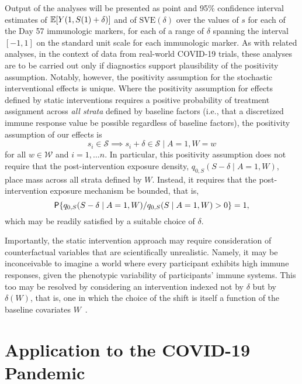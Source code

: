 Output of the analyses will be presented as point and 95\% confidence interval
estimates of $\E[Y(1, S(1) + \delta)]$ and of $\text{SVE}(\delta)$ over the
values of $s$ for each of the Day 57 immunologic markers, for each of a range of
$\delta$ spanning the interval $[-1, 1]$ on the standard unit scale for each
immunologic marker. As with related analyses, in the context of data from
real-world COVID-19 trials, these analyses are to be carried out only if
diagnostics support plausibility of the positivity assumption. Notably, however,
the positivity assumption for the stochastic interventional effects is unique.
Where the positivity assumption for effects defined by static interventions
requires a positive probability of treatment assignment across \textit{all
strata} defined by baseline factors (i.e., that a discretized immune response
value be possible regardless of baseline factors), the positivity assumption of
our effects is
\begin{equation*}
  s_i \in \mathcal{S} \implies s_i + \delta \in \mathcal{S} \mid A = 1, W = w
\end{equation*}
\noindent for all $w \in \mathcal{W}$ and $i = 1, \ldots n$. In particular, this
positivity assumption does not require that the post-intervention exposure
density, $q_{0,S}(S - \delta \mid A = 1, W)$, place mass across all strata
defined by $W$. Instead, it requires that the post-intervention exposure
mechanism be bounded, that is,
\begin{equation*}
  \P \{q_{0,S}(S - \delta \mid A = 1, W) / q_{0,S}(S \mid A = 1, W) > 0 \} = 1,
\end{equation*}
\noindent which may be readily satisfied by a suitable choice of $\delta$.

Importantly, the static intervention approach may require consideration of
counterfactual variables that are scientifically unrealistic. Namely, it may be
inconceivable to imagine a world where every participant exhibits high immune
responses, given the phenotypic variability of participants' immune systems.
This too may be resolved by considering an intervention indexed not by $\delta$
but by $\delta(W)$, that is, one in which the choice of the shift is itself
a function of the baseline covariates $W$~\citep{hejazi2020efficient,
diaz2012population, haneuse2013estimation, diaz2018stochastic}.

\section{Application to the COVID-19 Pandemic}

